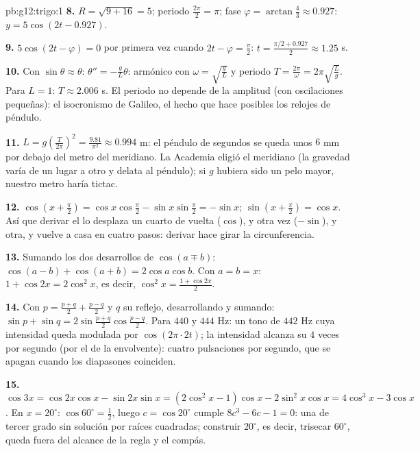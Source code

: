 \begin{solution}{pb:g12:trigo:1}
\textbf{8.} $R = \sqrt{9 + 16} = 5$; periodo $\frac{2\pi}{2} = \pi$; fase
$\varphi = \arctan\frac43 \approx 0.927$: $y = 5\cos(2t - 0.927)$.

\textbf{9.} $5\cos(2t - \varphi) = 0$ por primera vez cuando
$2t - \varphi = \frac\pi2$: $t = \frac{\pi/2 + 0.927}{2} \approx 1.25$ s.

\textbf{10.} Con $\sin\theta \approx \theta$:
$\theta'' = -\frac gL \theta$: armónico con $\omega = \sqrt{\frac gL}$ y
periodo $T = \frac{2\pi}{\omega} = 2\pi\sqrt{\frac Lg}$. Para $L = 1$:
$T \approx 2.006$ s. El periodo no depende de la amplitud (con
oscilaciones pequeñas): el isocronismo de Galileo, el hecho que hace
posibles los relojes de péndulo.

\textbf{11.} $L = g\left(\frac{T}{2\pi}\right)^2 = \frac{9.81}{\pi^2}
\approx 0.994$ m: el péndulo de segundos se queda unos $6$ mm por debajo
del metro del meridiano. La Academia eligió el meridiano (la gravedad varía
de un lugar a otro y delata al péndulo); si $g$ hubiera sido un pelo mayor,
nuestro metro haría tictac.

\textbf{12.} $\cos\left(x + \frac\pi2\right) =
\cos x \cos\frac\pi2 - \sin x \sin\frac\pi2 = -\sin x$;
$\sin\left(x + \frac\pi2\right) = \cos x$. Así que derivar el  lo
desplaza un cuarto de vuelta ($\cos$), y otra vez ($-\sin$), y otra, y
vuelve a casa en cuatro pasos: derivar hace girar la circunferencia.

\textbf{13.} Sumando los dos desarrollos de $\cos(a \mp b)$:
$\cos(a-b) + \cos(a+b) = 2\cos a\cos b$. Con $a = b = x$:
$1 + \cos 2x = 2\cos^2 x$, es decir,
$\cos^2 x = \frac{1 + \cos 2x}{2}$.

\textbf{14.} Con $p = \frac{p+q}{2} + \frac{p-q}{2}$ y $q$ su reflejo,
desarrollando y sumando:
$\sin p + \sin q = 2\sin\frac{p+q}{2}\cos\frac{p-q}{2}$. Para $440$ y
$444$ Hz: un tono de $442$ Hz cuya intensidad queda modulada por
$\cos(2\pi \cdot 2t)$; la intensidad alcanza su  $4$ veces por
segundo (por el  de la envolvente): cuatro pulsaciones por
segundo, que se apagan cuando los diapasones coinciden.

\textbf{15.} $\cos 3x = \cos 2x\cos x - \sin 2x \sin x =
(2\cos^2 x - 1)\cos x - 2\sin^2 x\cos x = 4\cos^3 x - 3\cos x$. En
$x = 20^\circ$: $\cos 60^\circ = \frac12$, luego $c = \cos 20^\circ$ cumple
$8c^3 - 6c - 1 = 0$: una  de tercer grado sin solución por raíces
cuadradas; construir $20^\circ$, es decir, trisecar $60^\circ$, queda fuera
del alcance de la regla y el compás.


\end{solution}
